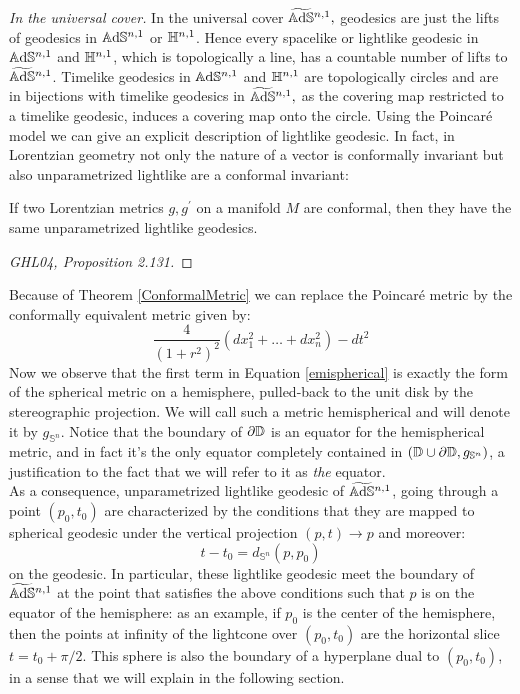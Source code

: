 \textit{In the universal cover.} In the universal cover $\widetilde{\mathbb{A}\mathrm{d}\mathbb{S}}{}^{n,1},$ geodesics are just the lifts of geodesics in $\mathbb{A}\mathrm{d}\mathbb{S}^{n,1}$ or $\mathbb{H}^{n,1}$. Hence every spacelike or lightlike geodesic in $\mathbb{A}\mathrm{d}\mathbb{S}^{n,1}$ and $\mathbb{H}^{n,1}$, which is topologically a line, has a countable number of lifts to $\widetilde{\mathbb{A}\mathrm{d}\mathbb{S}}{}^{n,1}$. Timelike geodesics in $\mathbb{A}\mathrm{d}\mathbb{S}^{n,1}$ and $\mathbb{H}^{n,1}$ are topologically circles and are in bijections with timelike geodesics in $\widetilde{\mathbb{A}\mathrm{d}\mathbb{S}}{}^{n,1},$ as the covering map restricted to a timelike geodesic, induces a covering map onto the circle. Using the Poincaré model we can give an explicit description of lightlike geodesic. In fact, in Lorentzian geometry not only the nature of a vector is conformally invariant but also unparametrized lightlike are a conformal invariant: 
\begin{theorem}\label{ConformalMetric} If two Lorentzian metrics $g,g^{\prime} $ on a manifold $M$ are conformal, then they have the same unparametrized lightlike geodesics.
\end{theorem}
\begin{proof}
    [GHL04, Proposition 2.131]
\end{proof}
Because of Theorem \ref{ConformalMetric} we can replace the Poincaré metric by the conformally equivalent metric given by:
\begin{equation}\label{emispherical}
    \frac{4}{(1+r^2)^2}(dx_1^2+\dots+dx_n^2)-dt^2
\end{equation} 
Now we observe that the first term in Equation \ref{emispherical} is exactly the form of the spherical metric on a hemisphere, pulled-back to the unit disk by the stereographic projection. We will call such a metric hemispherical and will denote it by $g_{\mathbb{S}^n}$. Notice that the boundary of $\partial\mathbb{D}$ is an equator for the hemispherical metric, and in fact it's the only equator completely contained in $(\mathbb{D}\cup\partial\mathbb{D},g_{\mathbb{S}^n})$, a justification to the fact that we will refer to it as \textit{the} equator.\\
As a consequence, unparametrized lightlike geodesic of $\widetilde{\mathbb{A}\mathrm{d}\mathbb{S}}{}^{n,1}$, going through a point $(p_0,t_0)$ are characterized by the conditions that they are mapped to spherical geodesic under the vertical projection $(p,t)\to p$ and moreover: 
\[
    t-t_0=d_{\mathbb{S}^n}(p,p_0)
\] on the geodesic. In particular, these lightlike geodesic meet the boundary of $\widetilde{\mathbb{A}\mathrm{d}\mathbb{S}}{}^{n,1}$ at the point that satisfies the above conditions such that $p$ is on the equator of the hemisphere: as an example, if $p_0$ is the center of the hemisphere, then the points at infinity of the lightcone over $(p_0,t_0)$ are the horizontal slice $t=t_{0}+\pi/2.$ This sphere is also the boundary of a hyperplane dual to $(p_0,t_0)$, in a sense that we will explain in the following section. 

